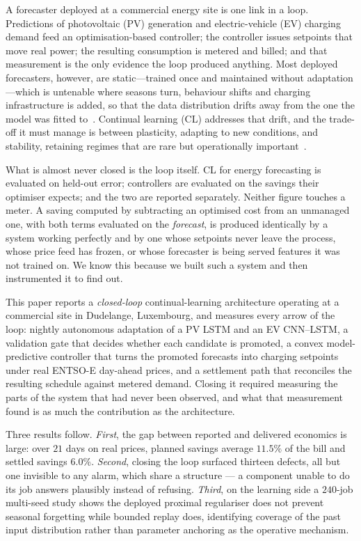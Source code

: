 \documentclass[journal]{IEEEtran}
\begin{document}
A forecaster deployed at a commercial energy site is one link in a loop.
Predictions of photovoltaic (PV) generation and electric-vehicle (EV) charging
demand feed an optimisation-based controller; the controller issues setpoints
that move real power; the resulting consumption is metered and billed; and that
measurement is the only evidence the loop produced anything. Most deployed
forecasters, however, are static---trained once and maintained without
adaptation---which is untenable where seasons turn, behaviour shifts and
charging infrastructure is added, so that the data distribution drifts away
from the one the model was fitted to~\cite{gama2014survey}. Continual
learning (CL) addresses that drift, and the trade-off it must manage is between
plasticity, adapting to new conditions, and stability, retaining regimes that
are rare but operationally
important~\cite{mccloskey1989catastrophic,french1999catastrophic}.

What is almost never closed is the loop itself. CL for energy forecasting is
evaluated on held-out error; controllers are evaluated on the savings their
optimiser expects; and the two are reported separately. Neither figure touches
a meter. A saving computed by subtracting an optimised cost from an unmanaged
one, with both terms evaluated on the \emph{forecast}, is produced identically
by a system working perfectly and by one whose setpoints never leave the
process, whose price feed has frozen, or whose forecaster is being served
features it was not trained on. We know this because we built such a system and
then instrumented it to find out.

This paper reports a \emph{closed-loop} continual-learning architecture
operating at a commercial site in Dudelange, Luxembourg, and measures every
arrow of the loop: nightly autonomous adaptation of a PV LSTM and an EV
CNN--LSTM, a validation gate that decides whether each candidate is promoted, a
convex model-predictive controller that turns the promoted forecasts into
charging setpoints under real ENTSO-E day-ahead prices, and a settlement path
that reconciles the resulting schedule against metered demand. Closing it
required measuring the parts of the system that had never been observed, and
what that measurement found is as much the contribution as the architecture.

Three results follow. \emph{First}, the gap between reported and delivered
economics is large: over $21$ days on real prices, planned savings average
$11.5\%$ of the bill and settled savings $6.0\%$. \emph{Second}, closing the
loop surfaced thirteen defects, all but one invisible to any alarm, which share
a structure --- a component unable to do its job answers plausibly instead of
refusing. \emph{Third}, on the learning side a $240$-job multi-seed study shows
the deployed proximal regulariser does not prevent seasonal forgetting while
bounded replay does, identifying coverage of the past input distribution rather
than parameter anchoring as the operative mechanism.
\end{document}
